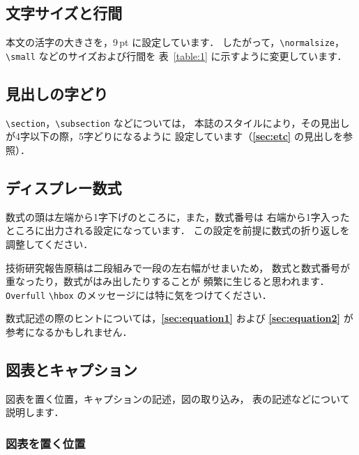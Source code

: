 \documentclass[technicalreport]{ieicej}
\begin{document}
\subsection{文字サイズと行間}

本文の活字の大きさを，9\,pt に設定しています．
したがって，\verb/\normalsize/，\verb/\small/ などのサイズおよび行間を
表~\ref{table:1} に示すように変更しています．

\subsection{見出しの字どり}

\verb/\section/，\verb/\subsection/ などについては，
本誌のスタイルにより，その見出しが4字以下の際，5字どりになるように
設定しています（{\bfseries \ref{sec:etc}} の見出しを参照）．

\subsection{ディスプレー数式}

数式の頭は左端から1字下げのところに，また，数式番号は
右端から1字入ったところに出力される設定になっています．
この設定を前提に数式の折り返しを調整してください．

技術研究報告原稿は二段組みで一段の左右幅がせまいため，
数式と数式番号が重なったり，数式がはみ出したりすることが
頻繁に生じると思われます．
\texttt{Overfull} \verb/\hbox/ のメッセージには特に気をつけてください．

数式記述の際のヒントについては，{\bfseries \ref{sec:equation1}} および
{\bfseries \ref{sec:equation2}} が参考になるかもしれません．

\subsection{図表とキャプション}

図表を置く位置，キャプションの記述，図の取り込み，
表の記述などについて説明します．

\subsubsection{図表を置く位置}
\end{document}
